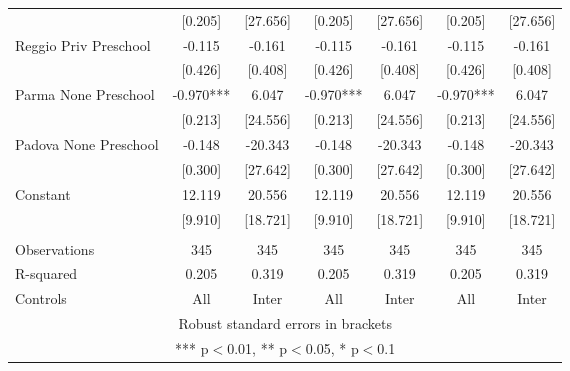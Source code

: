 \begin{tabular}{lcccccc}
 & [0.205] & [27.656] & [0.205] & [27.656] & [0.205] & [27.656] \\
Reggio Priv Preschool & -0.115 & -0.161 & -0.115 & -0.161 & -0.115 & -0.161 \\
 & [0.426] & [0.408] & [0.426] & [0.408] & [0.426] & [0.408] \\
Parma None Preschool & -0.970*** & 6.047 & -0.970*** & 6.047 & -0.970*** & 6.047 \\
 & [0.213] & [24.556] & [0.213] & [24.556] & [0.213] & [24.556] \\
Padova None Preschool & -0.148 & -20.343 & -0.148 & -20.343 & -0.148 & -20.343 \\
 & [0.300] & [27.642] & [0.300] & [27.642] & [0.300] & [27.642] \\
Constant & 12.119 & 20.556 & 12.119 & 20.556 & 12.119 & 20.556 \\
 & [9.910] & [18.721] & [9.910] & [18.721] & [9.910] & [18.721] \\
 &  &  &  &  &  &  \\
Observations & 345 & 345 & 345 & 345 & 345 & 345 \\
R-squared & 0.205 & 0.319 & 0.205 & 0.319 & 0.205 & 0.319 \\
 Controls & All & Inter & All & Inter & All & Inter \\ \hline
\multicolumn{7}{c}{ Robust standard errors in brackets} \\
\multicolumn{7}{c}{ *** p$<$0.01, ** p$<$0.05, * p$<$0.1} \\
\end{tabular}

